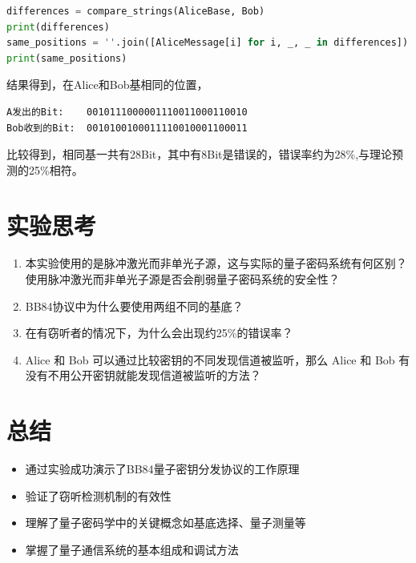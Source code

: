 \documentclass{ctexart}
\begin{document}
\begin{enumerate}
\begin{lstlisting}[language=python]
differences = compare_strings(AliceBase, Bob)
print(differences)
same_positions = ''.join([AliceMessage[i] for i, _, _ in differences])
print(same_positions)
\end{lstlisting}
结果得到，在Alice和Bob基相同的位置，
\begin{lstlisting}
A发出的Bit:    0010111000001110011000110010
Bob收到的Bit:  0010100100011110010001100011
\end{lstlisting}

比较得到，相同基一共有28Bit，其中有8Bit是错误的，错误率约为28\%,与理论预测的25\%相符。
\end{enumerate}
\section{实验思考}
\begin{enumerate}
\item 本实验使用的是脉冲激光而非单光子源，这与实际的量子密码系统有何区别？使用脉冲激光而非单光子源是否会削弱量子密码系统的安全性？
\item BB84协议中为什么要使用两组不同的基底？
\item 在有窃听者的情况下，为什么会出现约25\%的错误率？
\item Alice 和 Bob 可以通过比较密钥的不同发现信道被监听，那么 Alice 和 Bob 有没有不用公开密钥就能发现信道被监听的方法？
\end{enumerate}

\section{总结}
\begin{itemize}
\item 通过实验成功演示了BB84量子密钥分发协议的工作原理
\item 验证了窃听检测机制的有效性
\item 理解了量子密码学中的关键概念如基底选择、量子测量等
\item 掌握了量子通信系统的基本组成和调试方法
\end{itemize}
\end{document}
